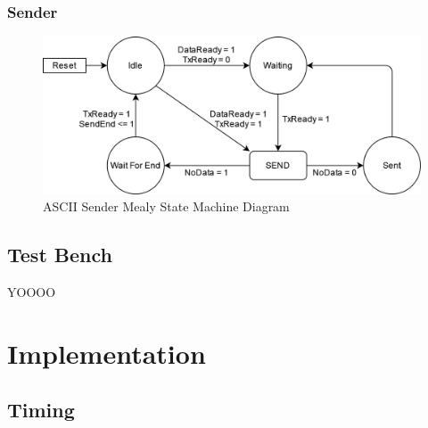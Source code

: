 \documentclass[11pt]{article}
\begin{document}
\subsubsection{Sender}
\begin{figure}[H]        
    \centering
    \includegraphics[width=.66\textwidth]{SenderSM.drawio.png}
    \caption{ASCII Sender Mealy State Machine Diagram}
    \label{fig:sendersm}
\end{figure} 


\subsection{Test Bench}
YOOOO


\section{Implementation}
\subsection{Timing}

\pagebreak
\printbibliography
\end{document}
